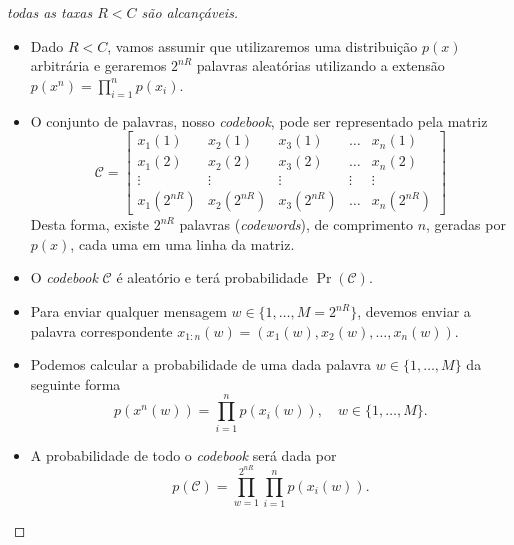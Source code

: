 \begin{frame}[allowframebreaks]
  \framebreak
  
  \begin{proof}[todas as taxas $R < C$ são alcançáveis]
  \begin{itemize}
  \item Dado $R < C$, vamos assumir que utilizaremos uma distribuição $p(x)$ arbitrária e geraremos
	$2^{nR}$ palavras aleatórias utilizando a extensão $p(x^n) = \prod_{i=1}^{n} p(x_i)$.
  \item O conjunto de palavras, nosso \textit{codebook}, pode ser representado pela matriz
	\begin{equation}
	\mathcal{C} = \begin{bmatrix}
		x_1(1) & x_2(1) & x_3(1) & \ldots & x_n(1) \\
		x_1(2) & x_2(2) & x_3(2) & \ldots & x_n(2) \\
		\vdots & \vdots & \vdots & \vdots & \vdots \\
		x_1(2^{nR}) & x_2(2^{nR}) & x_3(2^{nR}) & \ldots & x_n(2^{nR}) 
		\end{bmatrix}
	\end{equation}
	Desta forma, existe $2^{nR}$ palavras (\textit{codewords}), de comprimento $n$, 
	geradas por $p(x)$, cada uma em uma linha da matriz.
  \end{itemize}

  \proofbreak

  \begin{itemize}
  \item O \textit{codebook} $\mathcal{C}$ é aleatório e terá probabilidade $\Pr(\mathcal{C})$.
  \item Para enviar qualquer mensagem $w \in \{1, \ldots, M=2^{nR}\}$, devemos enviar a palavra
	correspondente $x_{1:n}(w)=\left( x_1(w), x_2(w), \ldots, x_n(w) \right)$.
  \item Podemos calcular a probabilidade de uma dada palavra $w \in \{1, \ldots, M\}$ da seguinte forma
	\begin{equation}
	p\left( x^n(w) \right) = \prod_{i=1}^{n} p\left( x_i(w) \right) , \quad w \in \{1, \ldots, M\} .
	\end{equation}
  \end{itemize}

  \proofbreak

  \begin{itemize}
  \item A probabilidade de todo o \textit{codebook} será dada por
	\begin{equation}
	p(\mathcal{C}) = \prod_{w=1}^{2^{nR}} \prod_{i=1}^n p\left( x_i(w) \right) .
	\end{equation}
  \end{itemize}


\end{proof}
\end{frame}
